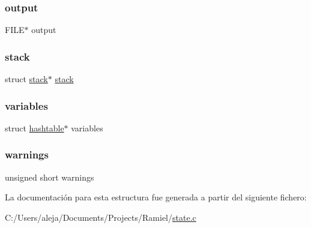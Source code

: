 \subsubsection{\texorpdfstring{output}{output}}
{\footnotesize\ttfamily F\+I\+LE$\ast$ output}

\mbox{\label{structstate_a3fdd23f2fd4b006bb7e38f0b39956c44}} 
\subsubsection{\texorpdfstring{stack}{stack}}
{\footnotesize\ttfamily struct \mbox{\hyperlink{structstack}{stack}}$\ast$ \mbox{\hyperlink{structstack}{stack}}}

\mbox{\label{structstate_a7e36c2490492a4c09cbe8a6ef51c5a95}} 
\subsubsection{\texorpdfstring{variables}{variables}}
{\footnotesize\ttfamily struct \mbox{\hyperlink{structhashtable}{hashtable}}$\ast$ variables}

\mbox{\label{structstate_a8f15148e128309c287fada7b1fa5090c}} 
\subsubsection{\texorpdfstring{warnings}{warnings}}
{\footnotesize\ttfamily unsigned short warnings}



La documentación para esta estructura fue generada a partir del siguiente fichero\+:\begin{DoxyCompactItemize}
\item 
C\+:/\+Users/aleja/\+Documents/\+Projects/\+Ramiel/\mbox{\hyperlink{state_8c}{state.\+c}}\end{DoxyCompactItemize}
